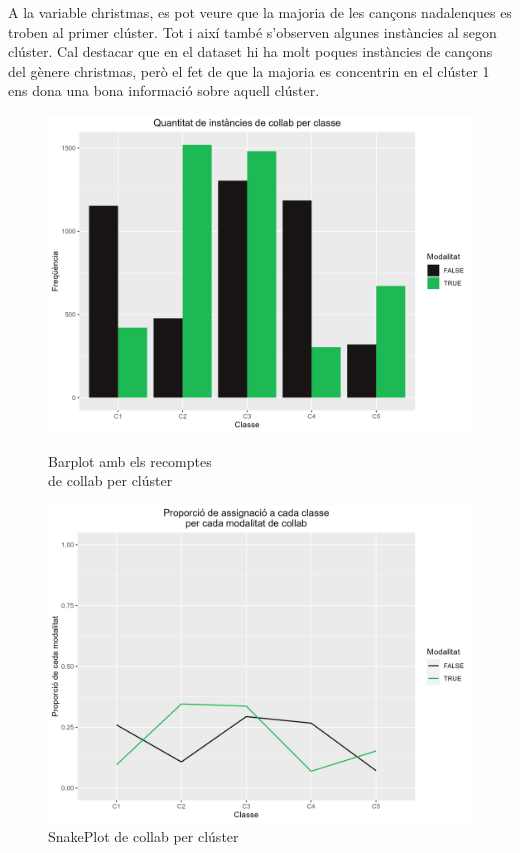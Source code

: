 \documentclass{article}
\begin{document}
A la variable christmas, es pot veure que la majoria de les cançons nadalenques es troben al primer clúster. Tot i així també s'observen algunes instàncies al segon clúster. Cal destacar que en el dataset hi ha molt poques instàncies de cançons del gènere christmas, però el fet de que la majoria es concentrin en el clúster 1 ens dona una bona informació sobre aquell clúster. 


\begin{figure}[H]
\centering
    \begin{minipage}{.49\textwidth}
        \centering
        \includegraphics[width=0.95\linewidth]{Images/5_Profiling/categoriques/cat/Cat_BarPlot_collab.png}
        \caption{Barplot amb els recomptes \\ de collab per clúster}
        \label{fig:Cat_BarPlot_collab}
    \end{minipage}%
    \begin{minipage}{.49\textwidth}
        \centering
        \includegraphics[width=0.95\linewidth]{Images/5_Profiling/categoriques/cat/Cat_SnakePlot_collab.png}
        \caption{SnakePlot de collab per clúster}
        \label{fig:Cat_SnakePlot_collab}
    \end{minipage}%
\end{figure}
\end{document}
